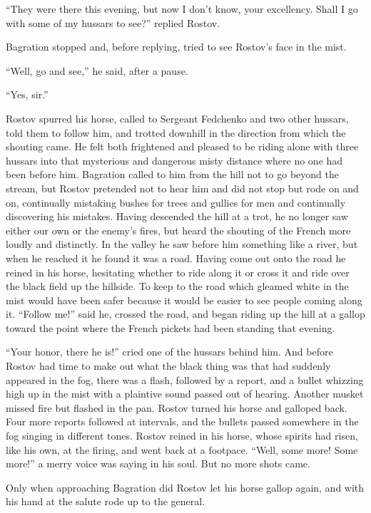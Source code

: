 ``They were there this evening, but now I don't know, your
excellency.  Shall I go with some of my hussars to see?'' replied
Rostov.

Bagration stopped and, before replying, tried to see Rostov's
face in the mist.

``Well, go and see,'' he said, after a pause.

``Yes, sir.''

Rostov spurred his horse, called to Sergeant Fedchenko and two
other hussars, told them to follow him, and trotted downhill in
the direction from which the shouting came. He felt both
frightened and pleased to be riding alone with three hussars into
that mysterious and dangerous misty distance where no one had
been before him. Bagration called to him from the hill not to go
beyond the stream, but Rostov pretended not to hear him and did
not stop but rode on and on, continually mistaking bushes for
trees and gullies for men and continually discovering his
mistakes.  Having descended the hill at a trot, he no longer saw
either our own or the enemy's fires, but heard the shouting of
the French more loudly and distinctly. In the valley he saw
before him something like a river, but when he reached it he
found it was a road. Having come out onto the road he reined in
his horse, hesitating whether to ride along it or cross it and
ride over the black field up the hillside. To keep to the road
which gleamed white in the mist would have been safer because it
would be easier to see people coming along it. ``Follow me!''
said he, crossed the road, and began riding up the hill at a
gallop toward the point where the French pickets had been
standing that evening.

``Your honor, there he is!'' cried one of the hussars behind
him. And before Rostov had time to make out what the black thing
was that had suddenly appeared in the fog, there was a flash,
followed by a report, and a bullet whizzing high up in the mist
with a plaintive sound passed out of hearing. Another musket
missed fire but flashed in the pan.  Rostov turned his horse and
galloped back. Four more reports followed at intervals, and the
bullets passed somewhere in the fog singing in different
tones. Rostov reined in his horse, whose spirits had risen, like
his own, at the firing, and went back at a footpace. ``Well, some
more! Some more!'' a merry voice was saying in his soul. But no
more shots came.

Only when approaching Bagration did Rostov let his horse gallop
again, and with his hand at the salute rode up to the general.

